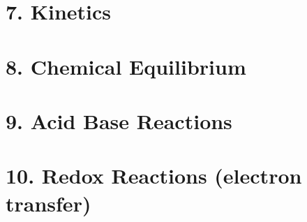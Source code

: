 \documentclass{cheatsheet}
\begin{document}
\section{7. Kinetics} %
	
	
	
	
	
	
	
	
	

\section{8. Chemical Equilibrium} %
	
	
	
	
	
\section{9. Acid Base Reactions} %
	
	
	
	
	

\section{10. Redox Reactions (electron transfer)} %
	
	
	
\end{document}
